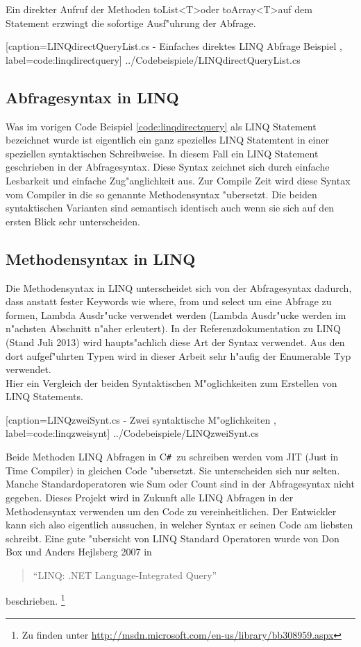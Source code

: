 \documentclass[pagesize, paper=a4, fontsize=12pt,titlepage=true, headings=small, headnosepline, abstractoff, liststotoc, nochapterprefix, plainheadsepline]{scrreprt}
\newcommand{\CSS}{C\texttt{\# }}
\newcommand{\GTS}{\textless T\textgreater\space}
\begin{document}
Ein direkter Aufruf der Methoden toList\GTS oder toArray\GTS auf dem Statement erzwingt die sofortige Ausf"uhrung der Abfrage.

			[caption={LINQdirectQueryList.cs - Einfaches direktes LINQ Abfrage Beispiel} \protect\cite{MicrosoftCReferenz.2013}, label=code:linqdirectquery]
			{../Codebeispiele/LINQdirectQueryList.cs}
		\subsection {Abfragesyntax in LINQ}
		Was im vorigen Code Beispiel \ref{code:linqdirectquery} als LINQ Statement bezeichnet wurde ist eigentlich ein ganz spezielles LINQ Statemtent in einer speziellen syntaktischen Schreibweise. In diesem Fall ein LINQ Statement geschrieben in der Abfragesyntax. Diese Syntax zeichnet sich durch einfache Lesbarkeit und einfache Zug"anglichkeit aus. Zur Compile Zeit wird diese Syntax vom Compiler in die so genannte Methodensyntax "ubersetzt. Die beiden syntaktischen Varianten sind semantisch identisch auch wenn sie sich auf den ersten Blick sehr unterscheiden.
		\subsection {Methodensyntax in LINQ}
		Die Methodensyntax in LINQ unterscheidet sich von der Abfragesyntax dadurch, dass anstatt fester Keywords wie where, from und select um eine Abfrage zu formen, Lambda Ausdr"ucke verwendet werden (Lambda Ausdr"ucke werden im n"achsten Abschnitt n"aher erleutert). In der Referenzdokumentation zu LINQ (Stand Juli 2013) \cite{MicrosoftCReferenz.2013} wird haupts"achlich diese Art der Syntax verwendet. Aus den dort aufgef"uhrten Typen wird in dieser Arbeit sehr h"aufig der Enumerable Typ verwendet.
\\
Hier ein Vergleich der beiden Syntaktischen M"oglichkeiten zum Erstellen von LINQ Statements.

			[caption={LINQzweiSynt.cs - Zwei syntaktische M"oglichkeiten} \protect\cite{MicrosoftCReferenz.2013}, label=code:linqzweisynt]
			{../Codebeispiele/LINQzweiSynt.cs}

Beide Methoden LINQ Abfragen in \CSS zu schreiben werden vom JIT (Just in Time Compiler) in gleichen Code "ubersetzt. Sie unterscheiden sich nur selten. Manche Standardoperatoren wie Sum oder Count sind in der Abfragesyntax nicht gegeben. Dieses Projekt wird in Zukunft alle LINQ Abfragen in der Methodensyntax verwenden um den Code zu vereinheitlichen. Der Entwickler kann sich also eigentlich aussuchen, in welcher Syntax er seinen Code am liebsten schreibt. Eine gute "ubersicht von LINQ Standard Operatoren wurde von Don Box und Anders Hejlsberg 2007 in \begin{quote}"`LINQ: .NET Language-Integrated Query"' \cite[Standard Query Operators in a Nutshell]{Box.2007}\end{quote} beschrieben. \footnote{Zu finden unter \url{http://msdn.microsoft.com/en-us/library/bb308959.aspx}}
\newline
\end{document}
